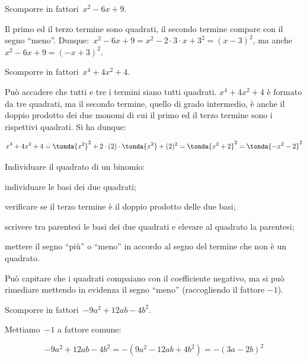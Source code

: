 \begin{esempio}{}{}
Scomporre in fattori~\(x^2-6x+9\).

Il primo ed il terzo termine sono quadrati, il secondo termine compare 
con il segno ``meno''.
Dunque:~\(x^2-6x+9=x^2-2\cdot 3\cdot x+3^{2}=(x-3)^{2}\), 
ma anche~\(x^2-6x+9=(-x+3)^{2}\).
\end{esempio}

\begin{esempio}{}{}
Scomporre in fattori~\(x^4+4x^2+4\).

Può accadere che tutti e tre i termini siano tutti quadrati. 
\(x^4+4x^2+4\) è formato da tre quadrati, ma il secondo termine, quello 
di grado intermedio, è anche il doppio prodotto dei due monomi di cui il 
primo ed il terzo termine sono i rispettivi quadrati.
Si ha dunque:

\vspace{-1.8em}
\[x^4+4x^2+4=
  \tonda{x^2}^{2}+2 \cdot (2) \cdot \tonda{x^2}+(2)^{2}=
  \tonda{x^2+2}^{2}=\tonda{-x^2-2}^{2}\]
\end{esempio}

\begin{procedura}{}{}
Individuare il quadrato di un binomio:
\begin{enumeratea}
\item individuare le basi dei due quadrati;
\item verificare se il terzo termine è il doppio prodotto delle due 
basi;
\item scrivere tra parentesi le basi dei due quadrati e elevare al 
quadrato la parentesi;
\item mettere il segno ``più'' o ``meno'' in accordo al segno del 
termine che non è un quadrato.
\end{enumeratea}
\end{procedura}

Può capitare che i quadrati compaiano con il coefficiente negativo, 
ma si può rimediare mettendo in evidenza il segno ``meno'' 
(raccogliendo il fattore \(-1\)).

\begin{esempio}{}{}
Scomporre in fattori~\(-9a^{2}+12{ab}-4b^{2}\).

Mettiamo~\(-1\) a fattore comune:

\vspace{-1.0em}
\[-9a^{2}+12ab-4b^{2}=-(9a^{2}-12{ab}+4b^{2})=-(3a-2b)^{2}\]
\end{esempio}

